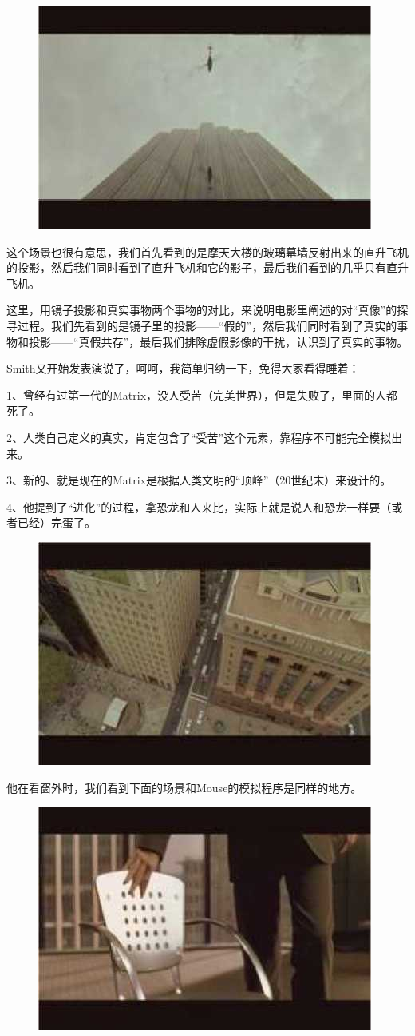 \documentclass{ctexart}
\begin{document}
\begin{figure}[htb]
\centering
\includegraphics[width=0.5\linewidth]{fig/read_Matrix-60}
\end{figure}

这个场景也很有意思，我们首先看到的是摩天大楼的玻璃幕墙反射出来的直升飞机的投影，然后我们同时看到了直升飞机和它的影子，最后我们看到的几乎只有直升飞机。

这里，用镜子投影和真实事物两个事物的对比，来说明电影里阐述的对“真像”的探寻过程。我们先看到的是镜子里的投影——“假的”，然后我们同时看到了真实的事物和投影——“真假共存”，最后我们排除虚假影像的干扰，认识到了真实的事物。

Smith又开始发表演说了，呵呵，我简单归纳一下，免得大家看得睡着：

1、曾经有过第一代的Matrix，没人受苦（完美世界），但是失败了，里面的人都死了。

2、人类自己定义的真实，肯定包含了“受苦”这个元素，靠程序不可能完全模拟出来。

3、新的、就是现在的Matrix是根据人类文明的“顶峰”（20世纪末）来设计的。

4、他提到了“进化”的过程，拿恐龙和人来比，实际上就是说人和恐龙一样要（或者已经）完蛋了。

\begin{figure}[htb]
\centering
\includegraphics[width=0.5\linewidth]{fig/read_Matrix-61}
\end{figure}

他在看窗外时，我们看到下面的场景和Mouse的模拟程序是同样的地方。

\begin{figure}[htb]
\centering
\includegraphics[width=0.5\linewidth]{fig/read_Matrix-62}
\end{figure}
\end{document}
